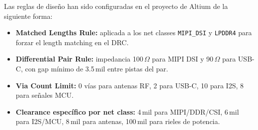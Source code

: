 Las reglas de diseño han sido configuradas en el proyecto de Altium de la siguiente forma:
\begin{itemize}
  \item \textbf{Matched Lengths Rule:} aplicada a los net classes \texttt{MIPI\_DSI} y \texttt{LPDDR4} para forzar el length matching en el DRC.
  \item \textbf{Differential Pair Rule:} impedancia 100\,$\Omega$ para MIPI DSI y 90\,$\Omega$ para USB-C, con gap mínimo de 3.5\,mil entre pistas del par.
  \item \textbf{Via Count Limit:} 0 vías para antenas RF, 2 para USB-C, 10 para I2S, 8 para señales MCU.
  \item \textbf{Clearance específico por net class:} 4\,mil para MIPI/DDR/CSI, 6\,mil para I2S/MCU, 8\,mil para antenas, 100\,mil para rieles de potencia.
\end{itemize}
